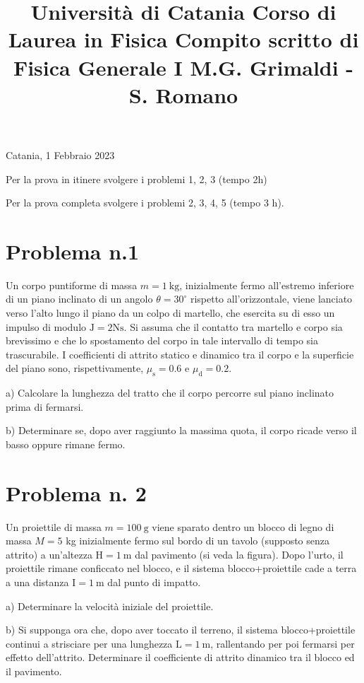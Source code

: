 \documentclass[10pt]{article}
\title{Università di Catania 
 Corso di Laurea in Fisica 
 Compito scritto di Fisica Generale I 
 M.G. Grimaldi - S. Romano }
\author{}
\date{}
\begin{document}
\maketitle
Catania, 1 Febbraio 2023

Per la prova in itinere svolgere i problemi 1, 2, 3 (tempo 2h)

Per la prova completa svolgere i problemi 2, 3, 4, 5 (tempo 3 h).

\section{Problema n.1}
Un corpo puntiforme di massa \(m=1 \mathrm{~kg}\), inizialmente fermo all'estremo inferiore di un piano inclinato di un angolo \(\theta=30^{\circ}\) rispetto all'orizzontale, viene lanciato verso l'alto lungo il piano da un colpo di martello, che esercita su di esso un impulso di modulo \(\mathrm{J}=2 \mathrm{Ns}\). Si assuma che il contatto tra martello e corpo sia brevissimo e che lo spostamento del corpo in tale intervallo di tempo sia trascurabile. I coefficienti di attrito statico e dinamico tra il corpo e la superficie del piano sono, rispettivamente, \(\mu_{\mathrm{s}}=0.6\) e \(\mu_{\mathrm{d}}=0.2\).

a) Calcolare la lunghezza del tratto che il corpo percorre sul piano inclinato prima di fermarsi.

b) Determinare se, dopo aver raggiunto la massima quota, il corpo ricade verso il basso oppure rimane fermo.

\section{Problema n. 2}
Un proiettile di massa \(m=100 \mathrm{~g}\) viene sparato dentro un blocco di legno di massa \(M=5\) kg inizialmente fermo sul bordo di un tavolo (supposto senza attrito) a un'altezza \(\mathrm{H}=1 \mathrm{~m}\) dal pavimento (si veda la figura). Dopo l'urto, il proiettile rimane conficcato nel blocco, e il sistema blocco+proiettile cade a terra a una distanza \(\mathrm{I}=1 \mathrm{~m}\) dal punto di impatto.

a) Determinare la velocità iniziale del proiettile.

b) Si supponga ora che, dopo aver toccato il terreno, il sistema blocco+proiettile continui a strisciare per una lunghezza \(\mathrm{L}=1 \mathrm{~m}\), rallentando per poi fermarsi per effetto dell'attrito. Determinare il coefficiente di attrito dinamico tra il blocco ed il pavimento.
\end{document}
